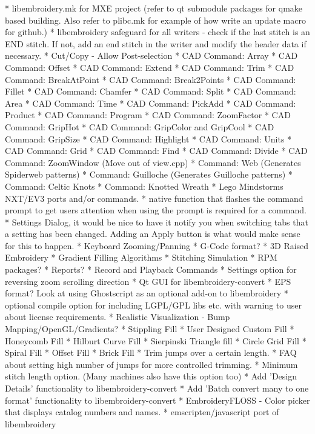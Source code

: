 * libembroidery.mk for MXE project (refer to qt submodule packages for qmake based building. Also refer to plibc.mk for example of how write an update macro for github.)
* libembroidery safeguard for all writers - check if the last stitch is an END stitch. If not, add an end stitch in the writer and modify the header data if necessary.
* Cut/Copy - Allow Post-selection
* CAD Command: Array
* CAD Command: Offset
* CAD Command: Extend
* CAD Command: Trim
* CAD Command: BreakAtPoint
* CAD Command: Break2Points
* CAD Command: Fillet
* CAD Command: Chamfer
* CAD Command: Split
* CAD Command: Area
* CAD Command: Time
* CAD Command: PickAdd
* CAD Command: Product
* CAD Command: Program
* CAD Command: ZoomFactor
* CAD Command: GripHot
* CAD Command: GripColor and GripCool
* CAD Command: GripSize
* CAD Command: Highlight
* CAD Command: Units
* CAD Command: Grid
* CAD Command: Find
* CAD Command: Divide
* CAD Command: ZoomWindow (Move out of view.cpp)
* Command: Web (Generates Spiderweb patterns)
* Command: Guilloche (Generates Guilloche patterns)
* Command: Celtic Knots
* Command: Knotted Wreath
* Lego Mindstorms NXT/EV3 ports and/or commands.
* native function that flashes the command prompt to get users attention when using the
prompt is required for a command.
* Settings Dialog, it would be nice to have it notify you when switching tabs that a
setting has been changed. Adding an Apply button is what would make sense for this to happen.
* Keyboard Zooming/Panning
* G-Code format?
* 3D Raised Embroidery
* Gradient Filling Algorithms
* Stitching Simulation
* RPM packages?
* Reports?
* Record and Playback Commands
* Settings option for reversing zoom scrolling direction
* Qt GUI for libembroidery-convert
* EPS format? Look at using Ghostscript as an optional add-on to libembroidery
* optional compile option for including LGPL/GPL libs etc. with warning to user about license requirements.
* Realistic Visualization - Bump Mapping/OpenGL/Gradients?
* Stippling Fill
* User Designed Custom Fill
* Honeycomb Fill
* Hilburt Curve Fill
* Sierpinski Triangle fill
* Circle Grid Fill
* Spiral Fill
* Offset Fill
* Brick Fill
* Trim jumps over a certain length.
* FAQ about setting high number of jumps for more controlled trimming.
* Minimum stitch length option. (Many machines also have this option too)
* Add 'Design Details' functionality to libembroidery-convert
* Add 'Batch convert many to one format' functionality to libembroidery-convert
* EmbroideryFLOSS - Color picker that displays catalog numbers and names.
* emscripten/javascript port of libembroidery

